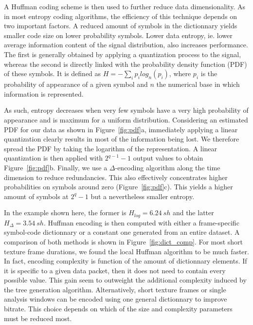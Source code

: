 \documentclass[final,3p,times,twocolumn]{elsarticle}
\begin{document}
A Huffman coding scheme \cite{huffman1952} is then used to further reduce data dimensionality. As in most entropy coding algorithms, the efficiency of this technique depends on two important factors. A reduced amount of symbols in the dictionnary yields smaller code size on lower probability symbols. Lower data entropy, ie. lower average information content of the signal distribution, also increases performance. The first is generally obtained by applying a quantization process to the signal, whereas the second is directly linked with the probability density function (PDF) of these symbols. It is defined as $H = -\sum\limits_i p_ilog_n(p_i)$, where $p_i$ is the probability of appearance of a given symbol and $n$ the numerical base in which information is represented.

As such, entropy decreases when very few symbols have a very high probability of appearance and is maximum for a uniform distribution. Considering an estimated PDF for our data as shown in Figure~\ref{fig:pdf}a, immediately applying a linear quantization clearly results in most of the information being lost. We therefore spread the PDF by taking the logarithm of the representation. A linear quantization is then applied with $2^{q-1}-1$ output values to obtain Figure~\ref{fig:pdf}b. Finally, we use a $\Delta$-encoding algorithm along the time dimension to reduce redundancies. This also effectively concentrates higher probabilities on symbols around zero (Figure~\ref{fig:pdf}c). This yields a higher amount of symbols at $2^q-1$ but a nevertheless smaller entropy.

In the example shown here, the former is $H_{log} = 6.24~sh$ and the latter $H_{\Delta} = 3.54~sh$. Huffman encoding is then computed with either a frame-specific symbol-code dictionnary or a constant one generated from an entire dataset. A comparison of both methods is shown in Figure~\ref{fig:dict_comp}. For most short texture frame durations, we found the local Huffman algorithm to be much faster. In fact, encoding complexity is function of the amount of dictionnary elements. If it is specific to a given data packet, then it does not need to contain every possible value. This gain seem to outweight the additional complexity induced by the tree generation algorithm. Alternatively, short texture frames or single analysis windows can be encoded using one general dictionnary to improve bitrate. This choice depends on which of the size and complexity parameters must be reduced most.\\
\end{document}
